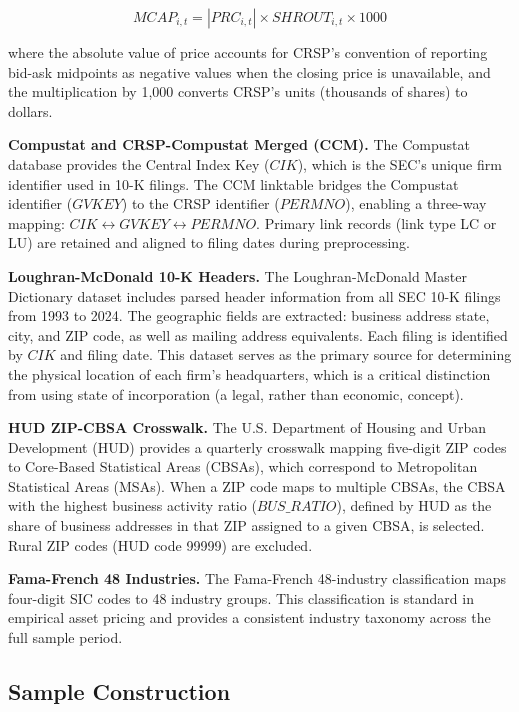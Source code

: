 \documentclass[
  12pt,
]{article}
\begin{document}
\[MCAP_{i,t} = |PRC_{i,t}| \times SHROUT_{i,t} \times 1000\]

\noindent where the absolute value of price accounts for CRSP's
convention of reporting bid-ask midpoints as negative values when the
closing price is unavailable, and the multiplication by 1,000 converts
CRSP's units (thousands of shares) to dollars.

\textbf{Compustat and CRSP-Compustat Merged (CCM).} The Compustat
database provides the Central Index Key (\(CIK\)), which is the SEC's
unique firm identifier used in 10-K filings. The CCM linktable bridges
the Compustat identifier (\(GVKEY\)) to the CRSP identifier
(\(PERMNO\)), enabling a three-way mapping:
\(CIK \leftrightarrow GVKEY \leftrightarrow PERMNO\). Primary link
records (link type LC or LU) are retained and aligned to filing dates
during preprocessing.

\textbf{Loughran-McDonald 10-K Headers.} The Loughran-McDonald Master
Dictionary dataset includes parsed header information from all SEC 10-K
filings from 1993 to 2024. The geographic fields are extracted: business
address state, city, and ZIP code, as well as mailing address
equivalents. Each filing is identified by \(CIK\) and filing date. This
dataset serves as the primary source for determining the physical
location of each firm's headquarters, which is a critical distinction
from using state of incorporation (a legal, rather than economic,
concept).

\textbf{HUD ZIP-CBSA Crosswalk.} The U.S. Department of Housing and
Urban Development (HUD) provides a quarterly crosswalk mapping
five-digit ZIP codes to Core-Based Statistical Areas (CBSAs), which
correspond to Metropolitan Statistical Areas (MSAs). When a ZIP code
maps to multiple CBSAs, the CBSA with the highest business activity
ratio (\(BUS\_RATIO\)), defined by HUD as the share of business
addresses in that ZIP assigned to a given CBSA, is selected. Rural ZIP
codes (HUD code 99999) are excluded.

\textbf{Fama-French 48 Industries.} The Fama-French 48-industry
classification maps four-digit SIC codes to 48 industry groups. This
classification is standard in empirical asset pricing and provides a
consistent industry taxonomy across the full sample period.

\subsection{Sample Construction}\label{sample-construction}
\end{document}
